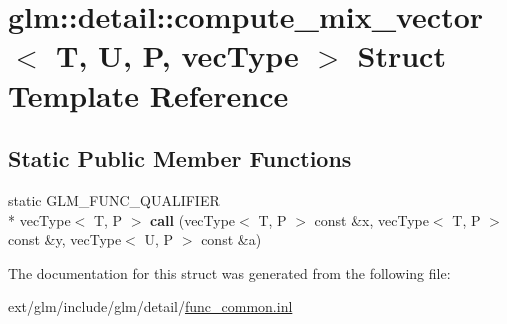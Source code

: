 \hypertarget{structglm_1_1detail_1_1compute__mix__vector}{\section{glm\-:\-:detail\-:\-:compute\-\_\-mix\-\_\-vector$<$ T, U, P, vec\-Type $>$ Struct Template Reference}
\label{structglm_1_1detail_1_1compute__mix__vector}
}
\subsection*{Static Public Member Functions}
\begin{DoxyCompactItemize}
\item 
\hypertarget{structglm_1_1detail_1_1compute__mix__vector_a68153ea8943ca1ffac025040a197c590}{static G\-L\-M\-\_\-\-F\-U\-N\-C\-\_\-\-Q\-U\-A\-L\-I\-F\-I\-E\-R \\*
vec\-Type$<$ T, P $>$ {\bfseries call} (vec\-Type$<$ T, P $>$ const \&x, vec\-Type$<$ T, P $>$ const \&y, vec\-Type$<$ U, P $>$ const \&a)}\label{structglm_1_1detail_1_1compute__mix__vector_a68153ea8943ca1ffac025040a197c590}

\end{DoxyCompactItemize}


The documentation for this struct was generated from the following file\-:\begin{DoxyCompactItemize}
\item 
ext/glm/include/glm/detail/\hyperlink{func__common_8inl}{func\-\_\-common.\-inl}\end{DoxyCompactItemize}
